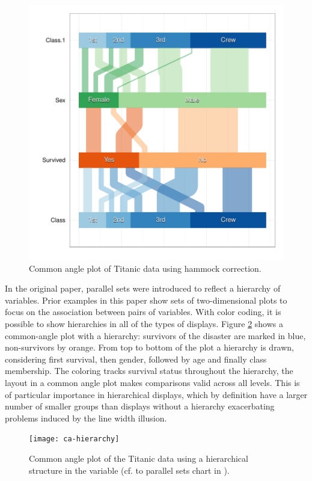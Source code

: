 \begin{figure}[htbp]
\centering
\includegraphics[width=\linewidth]{images/adj-angle}
\caption{\label{adj.angle}Common angle plot of Titanic data using hammock correction.}
\end{figure}
In the original paper, parallel sets were introduced to reflect a hierarchy of variables. 
Prior examples in this paper show sets of two-dimensional plots to focus on the association between 
pairs of variables. 
With color coding, it is possible to show hierarchies in all of the types of displays.
Figure \ref{tit-hierarchy}
shows a common-angle plot  with a hierarchy: survivors of the disaster are marked in blue, 
non-survivors by orange. From top to bottom of the plot a hierarchy is drawn, considering first 
survival, then gender, followed by age and finally class membership. The coloring tracks 
survival status throughout the hierarchy, the layout in a common angle plot makes comparisons 
valid across all levels. This is of particular importance in hierarchical displays, which
by definition have a larger number of smaller groups than displays without a hierarchy exacerbating 
problems induced by the line width illusion.


\begin{figure}[hbtp]
\texttt{[image: ca-hierarchy]}
\caption{\label{tit-hierarchy} Common angle plot of the Titanic data using a hierarchical structure in the variable (cf. to parallel sets chart in \cite{davies}). }
\end{figure}


